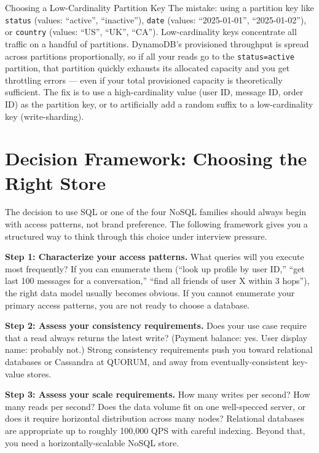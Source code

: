 \documentclass[11pt,a4paper]{article}
\begin{document}
\begin{trapbox}{Choosing a Low-Cardinality Partition Key}
The mistake: using a partition key like \texttt{status} (values: ``active'', ``inactive''), \texttt{date} (values: ``2025-01-01'', ``2025-01-02''), or \texttt{country} (values: ``US'', ``UK'', ``CA''). Low-cardinality keys concentrate all traffic on a handful of partitions. DynamoDB's provisioned throughput is spread across partitions proportionally, so if all your reads go to the \texttt{status=active} partition, that partition quickly exhausts its allocated capacity and you get throttling errors --- even if your total provisioned capacity is theoretically sufficient. The fix is to use a high-cardinality value (user ID, message ID, order ID) as the partition key, or to artificially add a random suffix to a low-cardinality key (write-sharding).
\end{trapbox}

\section{Decision Framework: Choosing the Right Store}

The decision to use SQL or one of the four NoSQL families should always begin with access patterns, not brand preference. The following framework gives you a structured way to think through this choice under interview pressure.

\textbf{Step 1: Characterize your access patterns.} What queries will you execute most frequently? If you can enumerate them (``look up profile by user ID,'' ``get last 100 messages for a conversation,'' ``find all friends of user X within 3 hops''), the right data model usually becomes obvious. If you cannot enumerate your primary access patterns, you are not ready to choose a database.

\textbf{Step 2: Assess your consistency requirements.} Does your use case require that a read always returns the latest write? (Payment balance: yes. User display name: probably not.) Strong consistency requirements push you toward relational databases or Cassandra at QUORUM, and away from eventually-consistent key-value stores.

\textbf{Step 3: Assess your scale requirements.} How many writes per second? How many reads per second? Does the data volume fit on one well-specced server, or does it require horizontal distribution across many nodes? Relational databases are appropriate up to roughly 100,000 QPS with careful indexing. Beyond that, you need a horizontally-scalable NoSQL store.
\end{document}
